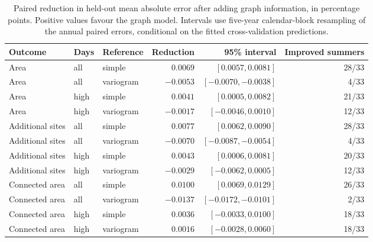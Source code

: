 \begin{table}[!htbp]
\centering\small
\caption{Paired reduction in held-out mean absolute error after adding graph
information, in percentage points. Positive values favour the graph model.
Intervals use five-year calendar-block resampling of the annual paired errors,
conditional on the fitted cross-validation predictions.}
\label{tab:application-paired}
\begin{tabular}{@{}lllrrr@{}}
\toprule
Outcome & Days & Reference & Reduction & 95\% interval & Improved summers\\
\midrule
Area & all & simple & $0.0069$ & $[0.0057,0.0081]$ & 28/33 \\
Area & all & variogram & $-0.0053$ & $[-0.0070,-0.0038]$ & 4/33 \\
Area & high & simple & $0.0041$ & $[0.0005,0.0082]$ & 21/33 \\
Area & high & variogram & $-0.0017$ & $[-0.0046,0.0010]$ & 12/33 \\
Additional sites & all & simple & $0.0077$ & $[0.0062,0.0090]$ & 28/33 \\
Additional sites & all & variogram & $-0.0070$ & $[-0.0087,-0.0054]$ & 4/33 \\
Additional sites & high & simple & $0.0043$ & $[0.0006,0.0081]$ & 20/33 \\
Additional sites & high & variogram & $-0.0029$ & $[-0.0062,0.0005]$ & 12/33 \\
Connected area & all & simple & $0.0100$ & $[0.0069,0.0129]$ & 26/33 \\
Connected area & all & variogram & $-0.0137$ & $[-0.0172,-0.0101]$ & 2/33 \\
Connected area & high & simple & $0.0036$ & $[-0.0033,0.0100]$ & 18/33 \\
Connected area & high & variogram & $0.0016$ & $[-0.0028,0.0060]$ & 18/33 \\
\bottomrule
\end{tabular}
\end{table}
